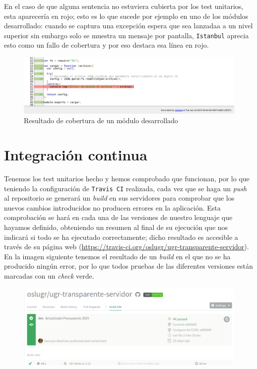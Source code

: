 En el caso de que alguna sentencia no estuviera cubierta por los test unitarios, esta aparecería en rojo; esto es lo que sucede por ejemplo en uno de los módulos desarrollado: cuando se captura una excepción espera que sea lanzadaa a un nivel superior sin embargo solo se muestra un mensaje por pantalla, {\tt Istanbul} aprecia esto como un fallo de cobertura y por eso destaca esa línea en rojo.

\begin{figure}[!ht]
	\begin{center}
		\includegraphics[width=1\textwidth]{../images/test_cobertura_03.png}
		\caption{Resultado de cobertura de un módulo desarrollado}
		\label{fig:test_cobertura_03}
	\end{center}
\end{figure}

\newpage
\section{Integración continua}

Tenemos los test unitarios hecho y hemos comprobado que funcionan, por lo que teniendo la configuración de {\tt Travis CI} realizada, cada vez que se haga un \textit{push} al repositorio se generará un \textit{build} en sus servidores para comprobar que los nuevos cambios introducidos no producen errores en la aplicación. Esta comprobación se hará en cada una de las versiones de nuestro lenguaje que hayamos definido, obteniendo un resumen al final de su ejecución que nos indicará si todo se ha ejecutado correctamente; dicho resultado es accesible a través de su página web (\url{https://travis-ci.org/oslugr/ugr-transparente-servidor}). En la imagen siguiente tenemos el resultado de un \textit{build} en el que no se ha producido ningún error, por lo que todos pruebas de las diferentes versiones están marcadas con un \textit{check} verde.

\begin{figure}[!ht]
	\begin{center}
		\includegraphics[width=1\textwidth]{../images/integracion_continua_01.png}
		\caption{}
		\label{fig:integracion_continua_01}
	\end{center}
\end{figure}

